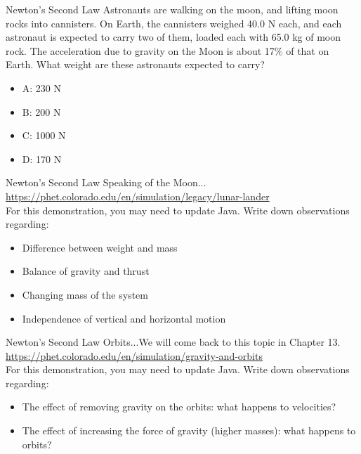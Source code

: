\documentclass{beamer}
\begin{document}
\begin{frame}{Newton's Second Law}
Astronauts are walking on the moon, and lifting moon rocks into cannisters.  On Earth, the cannisters weighed 40.0 N each, and each astronaut is expected to carry two of them, loaded each with 65.0 kg of moon rock.  The acceleration due to gravity on the Moon is about 17\% of that on Earth.  What weight are these astronauts expected to carry?
\begin{itemize}
\item A: 230 N
\item B: 200 N
\item C: 1000 N
\item D: 170 N
\end{itemize}
\end{frame}

\begin{frame}{Newton's Second Law}
Speaking of the Moon... \\
\vspace{1cm}
\url{https://phet.colorado.edu/en/simulation/legacy/lunar-lander} \\
\vspace{1cm}
For this demonstration, you may need to update Java.  Write down observations regarding:
\begin{itemize}
\item Difference between weight and mass
\item Balance of gravity and thrust
\item Changing mass of the system
\item Independence of vertical and horizontal motion
\end{itemize}
\end{frame}

\begin{frame}{Newton's Second Law}
Orbits...We will come back to this topic in Chapter 13. \\
\vspace{1 cm}
\url{https://phet.colorado.edu/en/simulation/gravity-and-orbits} \\
\vspace{1 cm}
For this demonstration, you may need to update Java.  Write down observations regarding:
\begin{itemize}
\item The effect of removing gravity on the orbits: what happens to velocities?
\item The effect of increasing the force of gravity (higher masses): what happens to orbits?
\end{itemize}
\end{frame}
\end{document}
